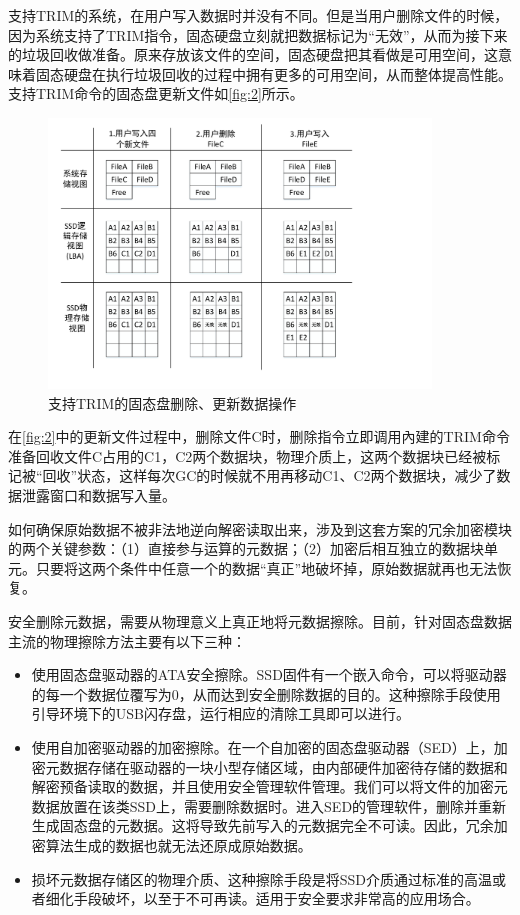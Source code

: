 支持TRIM的系统，在用户写入数据时并没有不同。但是当用户删除文件的时候，因为系统支持了TRIM指令，固态硬盘立刻就把数据标记为“无效”，从而为接下来的垃圾回收做准备。原来存放该文件的空间，固态硬盘把其看做是可用空间，这意味着固态硬盘在执行垃圾回收的过程中拥有更多的可用空间，从而整体提高性能。支持TRIM命令的固态盘更新文件如\autoref{fig:2}所示。
\begin{figure}[H]
	\centering
	\includegraphics[width=4in]{Pics/trim.pdf}
	\caption{支持TRIM的固态盘删除、更新数据操作}\label{fig:2}
\end{figure}
在\autoref{fig:2}中的更新文件过程中，删除文件C时，删除指令立即调用內建的TRIM命令准备回收文件C占用的C1，C2两个数据块，物理介质上，这两个数据块已经被标记被“回收”状态，这样每次GC的时候就不用再移动C1、C2两个数据块，减少了数据泄露窗口和数据写入量。


如何确保原始数据不被非法地逆向解密读取出来，涉及到这套方案的冗余加密模块的两个关键参数：（1）直接参与运算的元数据；（2）加密后相互独立的数据块单元。只要将这两个条件中任意一个的数据“真正”地破坏掉，原始数据就再也无法恢复。


安全删除元数据，需要从物理意义上真正地将元数据擦除。目前，针对固态盘数据主流的物理擦除方法主要有以下三种：
\begin{itemize}
	\item 使用固态盘驱动器的ATA安全擦除。SSD固件有一个嵌入命令，可以将驱动器的每一个数据位覆写为0，从而达到安全删除数据的目的。这种擦除手段使用引导环境下的USB闪存盘，运行相应的清除工具即可以进行。
	\item 使用自加密驱动器的加密擦除。在一个自加密的固态盘驱动器（SED）上，加密元数据存储在驱动器的一块小型存储区域，由内部硬件加密待存储的数据和解密预备读取的数据，并且使用安全管理软件管理。我们可以将文件的加密元数据放置在该类SSD上，需要删除数据时。进入SED的管理软件，删除并重新生成固态盘的元数据。这将导致先前写入的元数据完全不可读。因此，冗余加密算法生成的数据也就无法还原成原始数据。
	\item 损坏元数据存储区的物理介质、这种擦除手段是将SSD介质通过标准的高温或者细化手段破坏，以至于不可再读。适用于安全要求非常高的应用场合。
\end{itemize}



